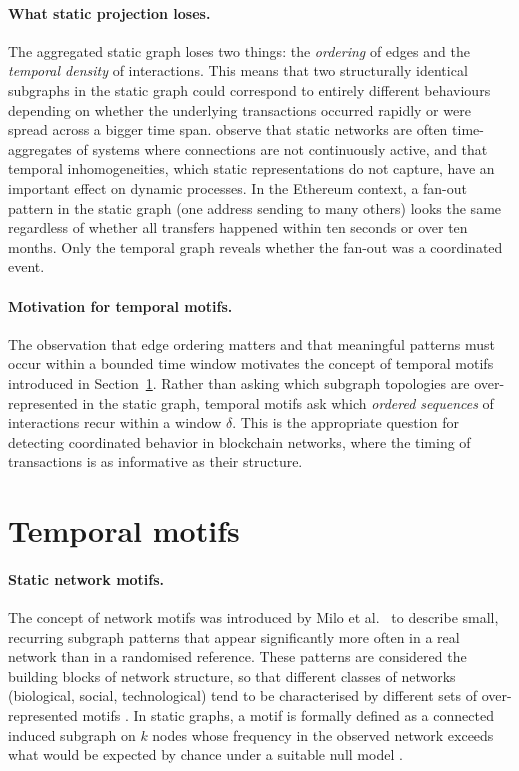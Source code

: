 \documentclass{thesisclass}
\begin{document}
\paragraph{What static projection loses.}
The aggregated static graph loses two things: the \emph{ordering} of edges and the \emph{temporal density} of interactions. This means that two structurally identical subgraphs in the static graph could correspond to entirely different behaviours depending on whether the underlying transactions occurred rapidly or were spread across a bigger time span. \cite{kovanen2011temporal} observe that static networks are often time-aggregates of systems where connections are not continuously active, and that temporal inhomogeneities, which static representations do not capture, have an important effect on dynamic processes. In the Ethereum context, a fan-out pattern in the static graph (one address sending to many others) looks the same regardless of whether all transfers happened within ten seconds or over ten months. Only the temporal graph reveals whether the fan-out was a coordinated event.

\paragraph{Motivation for temporal motifs.}
The observation that edge ordering matters and that meaningful patterns must occur within a bounded time window motivates the concept of temporal motifs introduced in Section~\ref{sec:motifs}. Rather than asking which subgraph topologies are over-represented in the static graph, temporal motifs ask which \emph{ordered sequences} of interactions recur within a window $\delta$. This is the appropriate question for detecting coordinated behavior in blockchain networks, where the timing of transactions is as informative as their structure.

\section{Temporal motifs}
\label{sec:motifs}

\paragraph{Static network motifs.}
The concept of network motifs was introduced by Milo et al.\ \citeyear{milo2002network} to describe small, recurring subgraph patterns that appear significantly more often in a real network than in a randomised reference. These patterns are considered the building blocks of network structure, so that different classes of networks (biological, social, technological) tend to be characterised by different sets of over-represented motifs \cite{milo2002network}. In static graphs, a motif is formally defined as a connected induced subgraph on $k$ nodes whose frequency in the observed network exceeds what would be expected by chance under a suitable null model \cite{milo2002network, newman2010networks}.
\end{document}
